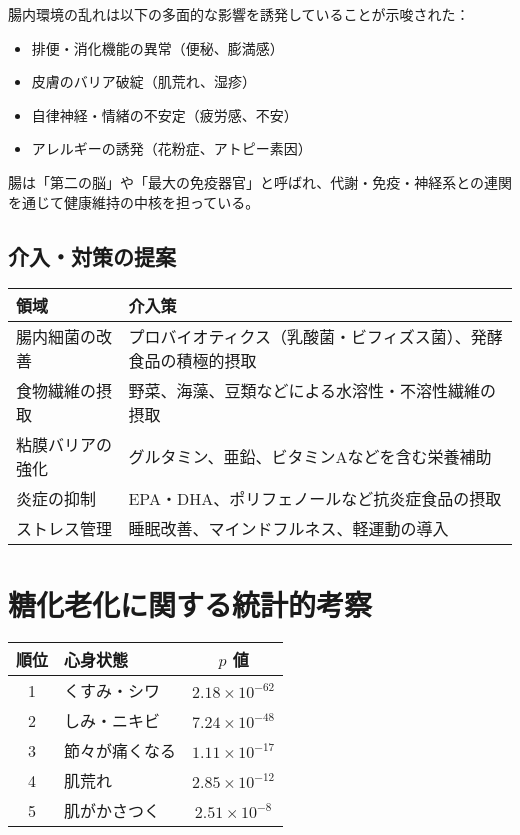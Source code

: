 \documentclass[a4paper,12pt]{article}
\begin{document}
腸内環境の乱れは以下の多面的な影響を誘発していることが示唆された：

\begin{itemize}
  \item 排便・消化機能の異常（便秘、膨満感）
  \item 皮膚のバリア破綻（肌荒れ、湿疹）
  \item 自律神経・情緒の不安定（疲労感、不安）
  \item アレルギーの誘発（花粉症、アトピー素因）
\end{itemize}

腸は「第二の脳」や「最大の免疫器官」と呼ばれ、代謝・免疫・神経系との連関を通じて健康維持の中核を担っている。

\subsection*{介入・対策の提案}

\begin{table}[h]
\centering
\begin{tabular}{|l|p{10cm}|}
\hline
\textbf{領域} & \textbf{介入策} \\
\hline
腸内細菌の改善 & プロバイオティクス（乳酸菌・ビフィズス菌）、発酵食品の積極的摂取 \\
\hline
食物繊維の摂取 & 野菜、海藻、豆類などによる水溶性・不溶性繊維の摂取 \\
\hline
粘膜バリアの強化 & グルタミン、亜鉛、ビタミンAなどを含む栄養補助 \\
\hline
炎症の抑制 & EPA・DHA、ポリフェノールなど抗炎症食品の摂取 \\
\hline
ストレス管理 & 睡眠改善、マインドフルネス、軽運動の導入 \\
\hline
\end{tabular}
\end{table}


\section{糖化老化に関する統計的考察}

\begin{table}[H]
\centering
\begin{tabular}{|c|l|c|}
\hline
順位 & 心身状態 & $p$ 値 \\
\hline
1 & くすみ・シワ & $2.18 \times 10^{-62}$ \\
2 & しみ・ニキビ & $7.24 \times 10^{-48}$ \\
3 & 節々が痛くなる & $1.11 \times 10^{-17}$ \\
4 & 肌荒れ & $2.85 \times 10^{-12}$ \\
5 & 肌がかさつく & $2.51 \times 10^{-8}$ \\
\hline
\end{tabular}
\end{table}
\end{document}
